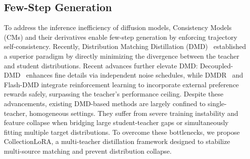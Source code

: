 
\vspace{-0.3cm}
\subsection{Few-Step Generation}
To address the inference inefficiency of diffusion models, Consistency Models (CMs) \cite{song2023consistency} and their derivatives \cite{luo2023latent,wang2024phased,zhai2024motion} enable few-step generation by enforcing trajectory self-consistency. Recently, Distribution Matching Distillation (DMD)~\cite{dmd1,dmd2} established a superior paradigm by directly minimizing the divergence between the teacher and student distributions. Recent advances further elevate DMD: Decoupled-DMD~\cite{decoupledmd} enhances fine details via independent noise schedules, while DMDR~\cite{jiang2025distribution} and Flash-DMD\cite{chen2025flash} integrate reinforcement learning to incorporate external preference rewards safely, surpassing the teacher's performance ceiling.
Despite these advancements, existing DMD-based methods are largely confined to single-teacher, homogeneous settings. They suffer from severe training instability and feature collapse when bridging large student-teacher gaps or simultaneously fitting multiple target distributions. To overcome these bottlenecks, we propose CollectionLoRA, a multi-teacher distillation framework designed to stabilize multi-source matching and prevent distribution collapse.
\vspace{-0.3cm}
